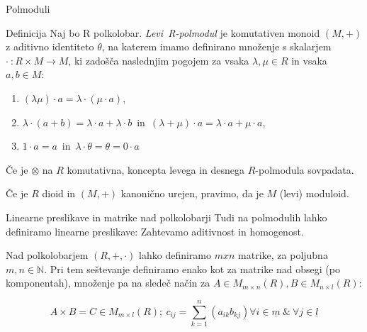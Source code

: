 \documentclass[t, 11pt]{beamer} %
\newcommand{\mth}[1]{\ensuremath{\mathbb{#1}}}
\newcommand{\R}{\mth{R}}
\newcommand{\N}{\mth{N}}
\newcommand{\pojem}[1]{\emph{#1}}
\newcommand{\map}[3]{\ensuremath{{#1}~: {#2} \rightarrow {#3}}}
\newcommand{\fillblack}[1]{
\begin{tikzpicture}[remember picture, overlay]
    \node [shift={(0 cm,0cm)}]  at (current page.south west)
        {%
        \begin{tikzpicture}[remember picture, overlay] at (current page.south west)
            \draw [fill=black] (0, 0) -- (0,#1 \paperheight) --
                              (\paperwidth,#1 \paperheight) -- (\paperwidth,0) -- cycle ;
        \end{tikzpicture}
        };
        \draw (current page.north west) rectangle (current page.south east);
\end{tikzpicture}
}
\begin{document}
%
%

\begin{frame}{Polmoduli}
	\begin{block}{Definicija}
			Naj bo R polkolobar. \pojem{Levi~R-polmodul} je komutativen monoid $(M, +)$ z aditivno identiteto $\theta$, na katerem imamo definirano množenje s skalarjem $\map{\cdot}{R\times M}{M}$, ki zadošča naslednjim pogojem za vsaka $\lambda,\mu\in R$ in vsaka $a, b\in M$:
			\begin{enumerate}
				\item $(\lambda\mu) \cdot a = \lambda \cdot (\mu \cdot a)$,
				\item $\lambda\cdot(a + b) = \lambda\cdot a + \lambda\cdot b$~in~$(\lambda + \mu)\cdot a = \lambda\cdot a + \mu\cdot a$,
				\item $1\cdot a = a$~in~$\lambda\cdot\theta = \theta = 0\cdot a$
			\end{enumerate}
			Če je $\otimes$ na $R$ komutativna, koncepta levega in desnega $R$-polmodula sovpadata.
			
			Če je $R$ dioid in $(M, +)$ kanonično urejen, pravimo, da je $M$ (levi) moduloid.
	\end{block}
\end{frame}

\begin{frame}{Linearne preslikave in matrike nad polkolobarji}
	Tudi na polmodulih lahko definiramo linearne preslikave: Zahtevamo aditivnost in homogenost.
	
	Nad polkolobarjem $(R, +, \cdot)$ lahko definiramo $mxn$ matrike, za poljubna $m,n\in\N$. Pri tem seštevanje definiramo enako kot za matrike nad obsegi (po komponentah), množenje pa na sledeč način za $A\in M_{m\times n}(R), B\in M_{n\times l}(R)$:
	
	$$ 
	A\times B = C \in M_{m\times l}(R);~ c_{ij} = \sum_{k = 1}^{n}(a_{ik}b_{kj}) \forall i \in \underline{m}~\&~\forall j \in \underline{l}
	$$
	
\end{frame}
\end{document}
